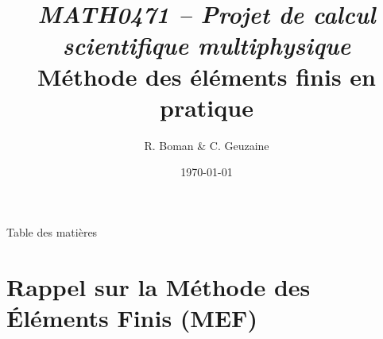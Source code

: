 \documentclass[
mode=present,    %
paper=a4paper,   %
orient=landscape,
display=slides,   %
size=10pt,     %
style=romain   %
]{powerdot}
\begin{document}
    \setlength{\belowdisplayskip}{2pt}
    \setlength{\belowdisplayshortskip}{2pt}
    \setlength{\abovedisplayskip}{2pt}
    \setlength{\abovedisplayshortskip}{2pt}

\title{\vspace{-5mm}
         {\sl\small MATH0471 -- Projet de calcul scientifique multiphysique} \\
        \vspace{5mm}
        \Large Méthode des éléments finis en pratique\\
        \vspace{5mm}
}
\author{R. Boman \& C. Geuzaine}
\date{\today}
\maketitle


\begin{slide}[toc=,bm=]{Table des matières}
\tableofcontents[content=sections] %
\end{slide}



\section[toc=Rappels MEF]{Rappel sur la Méthode des Éléments Finis (MEF)}
\end{document}
